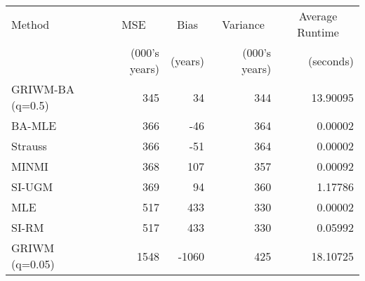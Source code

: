 
\begin{tabular}{lrrrr}
\toprule
\multicolumn{1}{l}{Method} & \multicolumn{1}{c}{MSE} & \multicolumn{1}{c}{Bias} & \multicolumn{1}{c}{Variance} & \multicolumn{1}{c}{Average Runtime} \\
 & (000's years) & (years) & (000's years) & (seconds)\\
\midrule
GRIWM-BA (q=0.5) & 345 & 34 & 344 & 13.90095\\
BA-MLE & 366 & -46 & 364 & 0.00002\\
Strauss & 366 & -51 & 364 & 0.00002\\
MINMI & 368 & 107 & 357 & 0.00092\\
SI-UGM & 369 & 94 & 360 & 1.17786\\
\addlinespace
MLE & 517 & 433 & 330 & 0.00002\\
SI-RM & 517 & 433 & 330 & 0.05992\\
GRIWM (q=0.05) & 1548 & -1060 & 425 & 18.10725\\
\bottomrule
\end{tabular}
